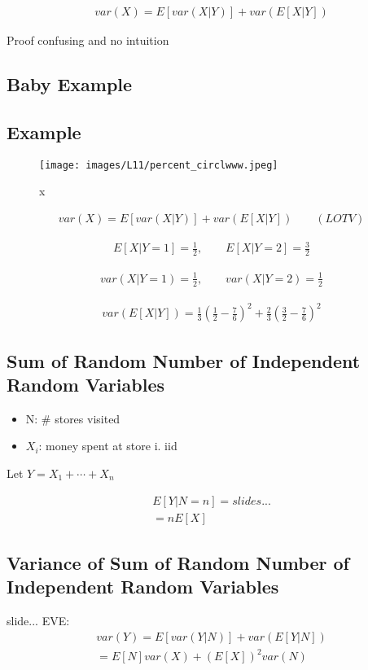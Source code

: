 \begin{align}
var(X) = E[var(X|Y)] + var(E[X|Y])
\label{eq_law_tot_var}
\end{align}

Proof confusing and no intuition

\subsection{Baby Example}


\subsection{Example}

\begin{figure}[h]
\centering
\texttt{[image: images/L11/percent\_circlwww.jpeg]}
\caption{x}
\end{figure}

\begin{align*}
var(X) = E[var(X|Y)] + var(E[X|Y]) \qquad (LOTV)
\end{align*}

\begin{align*}
E[X|Y=1] = \frac{1}{2}, \qquad E[X|Y=2] = \frac{3}{2}
\end{align*}

\begin{align*}
var(X|Y=1) = \frac{1}{2}, \qquad var(X|Y=2) = \frac{1}{2}
\end{align*}

\begin{align*}
var(E[X|Y]) = \frac{1}{3} \left(\frac{1}{2} - \frac{7}{6} \right)^2 + \frac{2}{3} \left( \frac{3}{2} - \frac{7}{6} \right)^2
\end{align*}

\subsection{Sum of Random Number of Independent Random Variables}


\begin{itemize}
    \item N: \# stores visited
    \item $X_i$: money spent at store i. iid
\end{itemize}


Let $Y=X_1+ \cdots + X_n$

\begin{align*}
    E[Y|N=n] = slides...\\
    = nE[X]
\end{align*}

\subsection{Variance of Sum of Random Number of Independent Random Variables}


slide...
EVE:
\begin{align*}
var(Y) = E[var(Y|N)] + var(E[Y|N])\\
 = E[N] var(X) + (E[X])^2 var(N)
\end{align*}